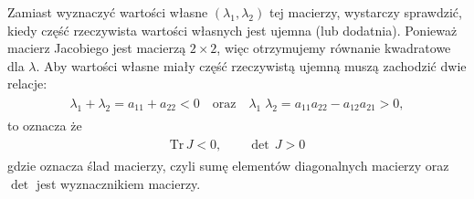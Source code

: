 \documentclass[a4paper,12pt,polish]{sphinxmanual}
\begin{document}
Zamiast wyznaczyć wartości własne $(\lambda_{1}, \lambda_{2})$ tej macierzy, wystarczy sprawdzić, kiedy część rzeczywista wartości własnych jest ujemna (lub dodatnia).  Ponieważ macierz Jacobiego jest macierzą $2 \times 2$, więc otrzymujemy równanie kwadratowe  dla $\lambda$. Aby wartości własne miały część rzeczywistą ujemną muszą zachodzić dwie relacje:
\label{ch1/chI023:equation-eqn46}\begin{gather}
\begin{split}\lambda_1 + \lambda_2  = a_{11}  + a_{22} <0  \quad \mbox{oraz} \quad \lambda_1 \; \lambda_2 = a_{11} a_{22}  -a_{12}a_{21} > 0,\end{split}\label{ch1/chI023-eqn46}
\end{gather}
to oznacza że
\label{ch1/chI023:equation-eqn46a}\begin{gather}
\begin{split}\mbox{Tr} \, J < 0, \qquad \det \,J > 0\end{split}\label{ch1/chI023-eqn46a}
\end{gather}
gdzie  oznacza ślad macierzy, czyli sumę elementów diagonalnych macierzy oraz $\det$ jest wyznacznikiem macierzy.
\end{document}
